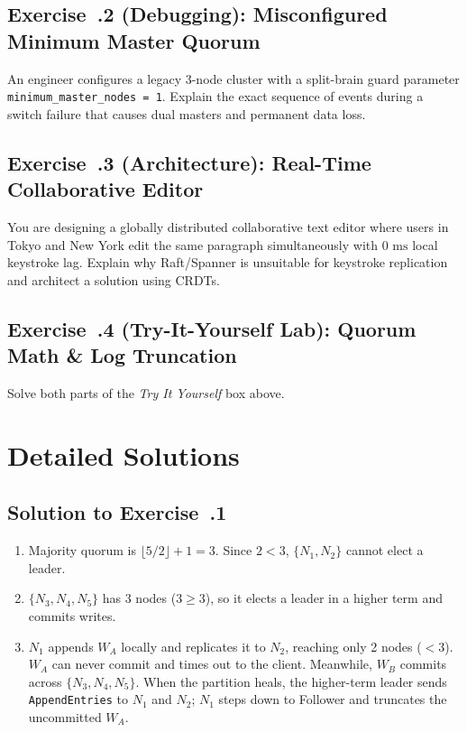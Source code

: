 \subsection*{Exercise~\thechapter.2 (Debugging): Misconfigured Minimum Master Quorum}
An engineer configures a legacy 3-node cluster with a split-brain guard parameter \texttt{minimum\_master\_nodes = 1}. Explain the exact sequence of events during a switch failure that causes dual masters and permanent data loss.

\subsection*{Exercise~\thechapter.3 (Architecture): Real-Time Collaborative Editor}
You are designing a globally distributed collaborative text editor where users in Tokyo and New York edit the same paragraph simultaneously with $0\text{ ms}$ local keystroke lag. Explain why Raft/Spanner is unsuitable for keystroke replication and architect a solution using CRDTs.

\subsection*{Exercise~\thechapter.4 (Try-It-Yourself Lab): Quorum Math \& Log Truncation}
Solve both parts of the \emph{Try It Yourself} box above.

\section{Detailed Solutions}

\subsection*{Solution to Exercise~\thechapter.1}
\begin{enumerate}[leftmargin=18pt]
  \item Majority quorum is $\lfloor 5/2 \rfloor + 1 = 3$. Since $2 < 3$, $\{N_1, N_2\}$ cannot elect a leader.
  \item $\{N_3, N_4, N_5\}$ has 3 nodes ($3 \ge 3$), so it elects a leader in a higher term and commits writes.
  \item $N_1$ appends $W_A$ locally and replicates it to $N_2$, reaching only 2 nodes ($< 3$). $W_A$ can never commit and times out to the client. Meanwhile, $W_B$ commits across $\{N_3, N_4, N_5\}$. When the partition heals, the higher-term leader sends \texttt{AppendEntries} to $N_1$ and $N_2$; $N_1$ steps down to Follower and truncates the uncommitted $W_A$.
\end{enumerate}

